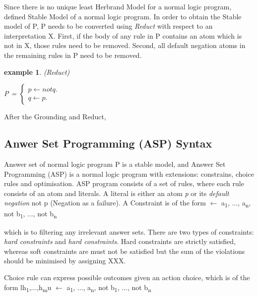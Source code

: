 \documentclass[12pt,twoside]{report}
\newtheorem{examp}{example}[section]
\begin{document}
Since there is no unique least Herbrand Model for a normal logic program, \cite{Gelfond1988} defined Stable Model of a normal logic program. In order to obtain the Stable model of P, P needs to be converted using \textit{Reduct} with respect to an interpretation X. First, if the body of any rule in P contains an atom which is not in X, those rules need to be removed. Second, all default negation atoms in the remaining rules in P need to be removed. 

\begin{examp} \normalfont (Reduct)

P = $\begin{cases}
	p  \leftarrow not q. \\
	q  \leftarrow p.
      \end{cases}$
\end{examp} 
\label{grounding}



After the Grounding and Reduct, 

\subsection{Anwer Set Programming (ASP) Syntax}

Answer set of normal logic program P is a stable model, and Answer Set Programming (ASP) is a normal logic program with extensions: constrains, choice rules and optimisation. ASP program consists of a set of rules, where each rule consists of an atom and literals.
A literal is either an atom \textit{p} or its \textit{default negation} not p (Negation as a failure).
A Constraint is of the form $\leftarrow$ a\textsubscript{1}, ..., a\textsubscript{n}, not b\textsubscript{1}, ..., not b\textsubscript{n}

which is to filtering any irrelevant answer sets.
There are two types of constraints: \textit{hard constraints} and \textit{hard constraints}. Hard constraints are strictly satisfied, whereas soft constraints are must not be satisfied but the sum of the violations should be minimised by assigning XXX. 

Choice rule can express possible outcomes given an action choice, which is of the form
l{h\textsubscript{1},...,h\textsubscript{m}}u $\leftarrow$ a\textsubscript{1}, ..., a\textsubscript{n}, not b\textsubscript{1}, ..., not b\textsubscript{n}
\end{document}
